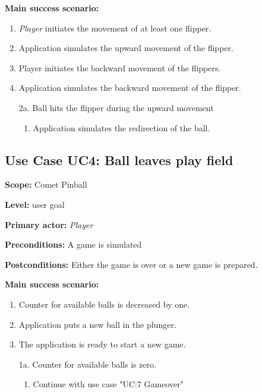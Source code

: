 \documentclass[fontsize=12pt,
               paper=a4,
               twoside=false,
               parskip=half,
               ]{scrartcl}
\begin{document}
\textbf{\textsf{Main success scenario:}}

\begin{enumerate}[leftmargin=3em]
	\item \emph{Player} initiates the movement of at least one flipper.
	\item Application simulates the upward movement of the flipper.
	\item Player initiates the backward movement of the flippers.
	\item Application simulates the backward movement of the flipper.
\end{enumerate}


\begin{itemize}[leftmargin=3em]
	\item[2a.] Ball hits the flipper during the upward movement
	\begin{enumerate}
		\item Application simulates the redirection of the ball.
	\end{enumerate}
\end{itemize}


\subsection{Use Case UC4: Ball leaves play field}

\textbf{\textsf{Scope:}} Comet Pinball

\textbf{\textsf{Level:}} user goal

\textbf{\textsf{Primary actor:}} \emph{Player}

\textbf{\textsf{Preconditions:}} A game is simulated

\textbf{\textsf{Postconditions:}} Either the game is over or a new game is prepared.

\textbf{\textsf{Main success scenario:}}

\begin{enumerate}[leftmargin=3em]
	\item Counter for available balls is decreased by one.
	\item Application puts a new ball in the plunger.
	\item The application is ready to start a new game.
\end{enumerate}


\begin{itemize}[leftmargin=3em]
	\item[1a.] Counter for available balls is zero.
	\begin{enumerate}
		\item Continue with use case "UC:7 Gameover"
	\end{enumerate}
\end{itemize}
\end{document}
